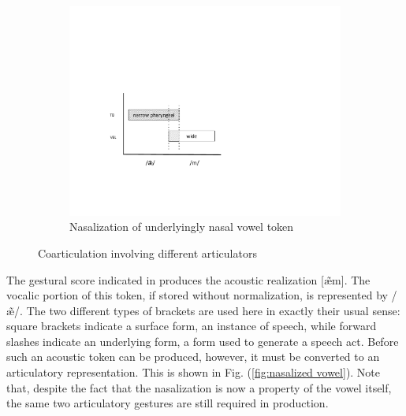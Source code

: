 \begin{figure}[H]
\begin{subfigure}[t]{.3\textwidth}
        \includegraphics[width=\linewidth]{figures/nasalization3.pdf}
        \caption{\label{fig:extra nasalization}Nasalization of underlyingly nasal vowel token}
    \end{subfigure}
    

\caption{\label{fig:Coarticulation}Coarticulation involving different articulators}
\end{figure}

The gestural score indicated in 
produces the acoustic realization {[æ̃m]}. The vocalic
portion of this token, if stored without normalization, is represented
by {/æ̃/}. The two different types of brackets are used
here in exactly their usual sense: square brackets indicate a surface
form, an instance of speech, while forward slashes indicate an underlying
form, a form used to generate a speech act. Before such an acoustic
token can be produced, however, it must be converted to an articulatory
representation. This is shown in Fig. (\ref{fig:nasalized vowel}).
Note that, despite the fact that the nasalization is now a property
of the vowel itself, the same two articulatory gestures are still
required in production.

